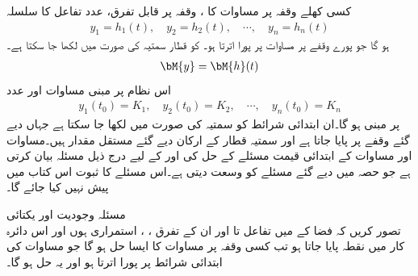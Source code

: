 کسی کھلے وقفہ  پر مساوات  کا ، وقفہ  پر قابل تفرق،  عدد  تفاعل کا سلسلہ
\begin{align*}
y_1=h_1(t),\quad y_2=h_2(t),\quad \cdots, \quad y_n=h_n(t)
\end{align*}
ہو گا جو  پورے  وقفے پر مساوات  پر پورا اترتا ہو۔ کو قطار سمتیہ  کی صورت میں لکھا جا سکتا ہے۔
\begin{align*}
\bM{y}=\bM{h}(t)
\end{align*}
اس نظام پر مبنی  مساوات  اور   عدد  
\begin{align}\label{مساوات_نظام_عمومی_ب}
y_1(t_0)=K_1, \quad y_2(t_0)=K_2,\quad \cdots,\quad y_n(t_0)=K_n
\end{align}
پر مبنی ہو گا۔ان ابتدائی شرائط کو سمتیہ کی صورت میں  لکھا جا سکتا ہے جہاں  دیے گئے وقفے پر پایا جاتا ہے اور سمتیہ قطار  کے ارکان دیے گئے مستقل مقدار ہیں۔مساوات  اور مساوات  کے ابتدائی قیمت مسئلے کے حل کی  اور  کے لیے  درج ذیل مسئلہ بیان کرتی ہے جو حصہ  میں دیے گئے مسئلے کو وسعت دیتی ہے۔اس مسئلے کا ثبوت اس کتاب میں پیش نہیں کیا جائے گا۔

\quad مسئلہ وجودیت اور یکتائی \\
تصور کریں کہ فضا  کے   میں  تفاعل  تا  اور ان کے تفرق ،   ،   استمراری ہوں اور اس دائرہ کار میں نقطہ  پایا جاتا ہو تب کسی وقفہ  پر مساوات  کا ایسا حل  ہو گا جو مساوات  کی ابتدائی شرائط پر پورا اترتا ہو اور  یہ حل  ہو گا۔

